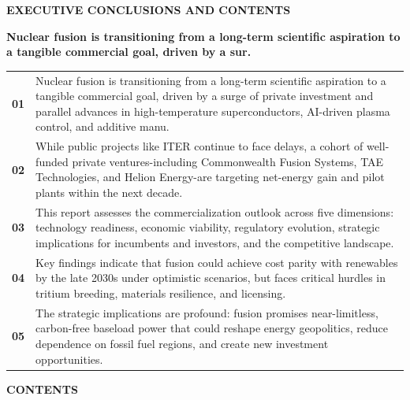 \documentclass[10pt,a4paper]{article}
\begin{document}
{\textcolor{BOBlue}{\scriptsize\bfseries EXECUTIVE CONCLUSIONS AND CONTENTS}}\par\vspace{-1pt}
{\Large\sffamily\bfseries\color{BONavy} Nuclear fusion is transitioning from a long-term scientific aspiration to a tangible commercial goal, driven by a sur.}\par\vspace{4pt}
\vspace{2pt}{\color{BOBright}\rule{\linewidth}{1pt}}\vspace{5pt}
\begin{tabularx}{\linewidth}{p{12mm}Y}
\textcolor{BOBlue}{\bfseries 01} & {\footnotesize Nuclear fusion is transitioning from a long-term scientific aspiration to a tangible commercial goal, driven by a surge of private investment and parallel advances in high-temperature superconductors, AI-driven plasma control, and additive manu.} \\[4pt]
\textcolor{BOBlue}{\bfseries 02} & {\footnotesize While public projects like ITER continue to face delays, a cohort of well-funded private ventures-including Commonwealth Fusion Systems, TAE Technologies, and Helion Energy-are targeting net-energy gain and pilot plants within the next decade.} \\[4pt]
\textcolor{BOBlue}{\bfseries 03} & {\footnotesize This report assesses the commercialization outlook across five dimensions: technology readiness, economic viability, regulatory evolution, strategic implications for incumbents and investors, and the competitive landscape.} \\[4pt]
\textcolor{BOBlue}{\bfseries 04} & {\footnotesize Key findings indicate that fusion could achieve cost parity with renewables by the late 2030s under optimistic scenarios, but faces critical hurdles in tritium breeding, materials resilience, and licensing.} \\[4pt]
\textcolor{BOBlue}{\bfseries 05} & {\footnotesize The strategic implications are profound: fusion promises near-limitless, carbon-free baseload power that could reshape energy geopolitics, reduce dependence on fossil fuel regions, and create new investment opportunities.} \\[4pt]
\end{tabularx}
\vspace{6pt}
{\textcolor{BOBlue}{\scriptsize\bfseries CONTENTS}}\par\vspace{2pt}
\end{document}
